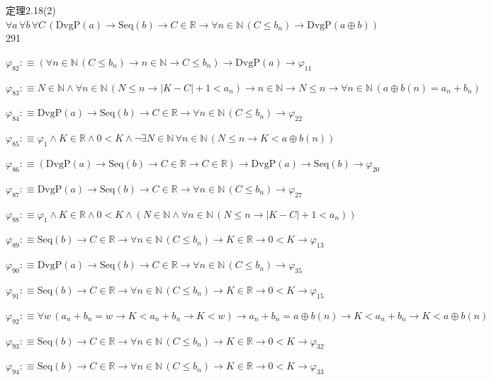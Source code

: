 \begin{fullproof}{定理2.18(2)}{$\forall a\,\forall b\,\forall C\,(\mathrm{DvgP}(a) \to \mathrm{Seq}(b) \to C \in \mathbb{R} \to \forall n \in \mathbb{N}\,(C \leq b_{n}) \to \mathrm{DvgP}(a \oplus b))$}{291}
\begin{abbrevlist}
\item $\varphi_{82} :\equiv (\forall n \in \mathbb{N}\,(C \leq b_{n}) \to n \in \mathbb{N} \to C \leq b_{n}) \to \mathrm{DvgP}(a) \to \varphi_{11}$
\item $\varphi_{83} :\equiv N \in \mathbb{N} \land \forall n \in \mathbb{N}\,(N \leq n \to \lvert K - C \rvert + 1 < a_{n}) \to n \in \mathbb{N} \to N \leq n \to \forall n \in \mathbb{N}\,(a \oplus b(n) = a_{n} + b_{n})$
\item $\varphi_{84} :\equiv \mathrm{DvgP}(a) \to \mathrm{Seq}(b) \to C \in \mathbb{R} \to \forall n \in \mathbb{N}\,(C \leq b_{n}) \to \varphi_{22}$
\item $\varphi_{85} :\equiv \varphi_{1} \land K \in \mathbb{R} \land 0 < K \land \neg \exists N \in \mathbb{N}\,\forall n \in \mathbb{N}\,(N \leq n \to K < a \oplus b(n))$
\item $\varphi_{86} :\equiv (\mathrm{DvgP}(a) \to \mathrm{Seq}(b) \to C \in \mathbb{R} \to C \in \mathbb{R}) \to \mathrm{DvgP}(a) \to \mathrm{Seq}(b) \to \varphi_{20}$
\item $\varphi_{87} :\equiv \mathrm{DvgP}(a) \to \mathrm{Seq}(b) \to C \in \mathbb{R} \to \forall n \in \mathbb{N}\,(C \leq b_{n}) \to \varphi_{27}$
\item $\varphi_{88} :\equiv \varphi_{1} \land K \in \mathbb{R} \land 0 < K \land (N \in \mathbb{N} \land \forall n \in \mathbb{N}\,(N \leq n \to \lvert K - C \rvert + 1 < a_{n}))$
\item $\varphi_{89} :\equiv \mathrm{Seq}(b) \to C \in \mathbb{R} \to \forall n \in \mathbb{N}\,(C \leq b_{n}) \to K \in \mathbb{R} \to 0 < K \to \varphi_{13}$
\item $\varphi_{90} :\equiv \mathrm{DvgP}(a) \to \mathrm{Seq}(b) \to C \in \mathbb{R} \to \forall n \in \mathbb{N}\,(C \leq b_{n}) \to \varphi_{35}$
\item $\varphi_{91} :\equiv \mathrm{Seq}(b) \to C \in \mathbb{R} \to \forall n \in \mathbb{N}\,(C \leq b_{n}) \to K \in \mathbb{R} \to 0 < K \to \varphi_{15}$
\item $\varphi_{92} :\equiv \forall w\,(a_{n} + b_{n} = w \to K < a_{n} + b_{n} \to K < w) \to a_{n} + b_{n} = a \oplus b(n) \to K < a_{n} + b_{n} \to K < a \oplus b(n)$
\item $\varphi_{93} :\equiv \mathrm{Seq}(b) \to C \in \mathbb{R} \to \forall n \in \mathbb{N}\,(C \leq b_{n}) \to K \in \mathbb{R} \to 0 < K \to \varphi_{32}$
\item $\varphi_{94} :\equiv \mathrm{Seq}(b) \to C \in \mathbb{R} \to \forall n \in \mathbb{N}\,(C \leq b_{n}) \to K \in \mathbb{R} \to 0 < K \to \varphi_{33}$

\end{abbrevlist}
\end{fullproof}
